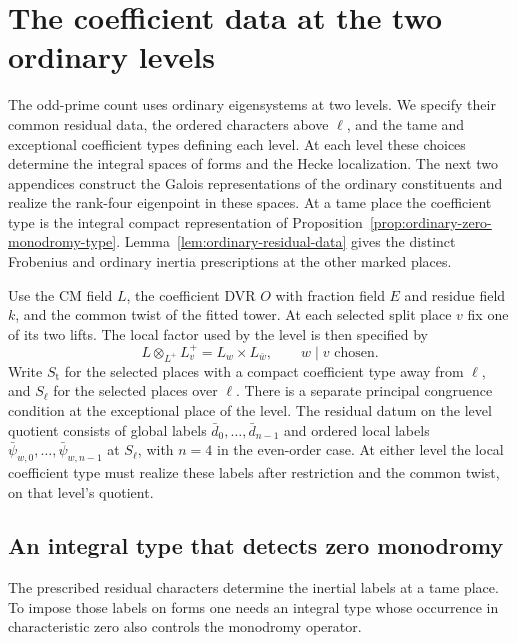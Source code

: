 \section{The coefficient data at the two ordinary levels}
\label{sec:count-two-level-data}
\hypertarget{source-ordinary-level-data}{}

The odd-prime count uses ordinary eigensystems at two levels. We specify their common residual data, the ordered characters above \(\ell\), and the tame and exceptional coefficient types defining each level. At each level these choices determine the
integral spaces of forms and the Hecke localization. The next two appendices construct the Galois representations of the ordinary constituents and realize the rank-four eigenpoint in these spaces. At a tame place the coefficient type is the integral compact representation of Proposition~\ref{prop:ordinary-zero-monodromy-type}. Lemma~\ref{lem:ordinary-residual-data} gives the distinct Frobenius and ordinary inertia prescriptions at the other marked places.

Use the CM field \(L\), the coefficient DVR \(O\) with fraction
field \(E\) and residue field \(k\), and the common twist of the
fitted tower. At each selected split place \(v\) fix one of its two lifts. The local factor used by the level is then specified by
\[
 L\otimes_{L^+}L^+_v=L_w\times L_{\bar w},\qquad w\mid v\text{ chosen}.
\] Write \(S_{\mathrm t}\)
for the selected places with a compact coefficient type away from
\(\ell\), and \(S_\ell\) for the selected places over \(\ell\).
There is a separate principal congruence condition at the
exceptional place of the level. The residual datum on the level
quotient consists of global labels \(\bar d_0,\ldots,\bar d_{n-1}\)
and ordered local labels \(\bar\psi_{w,0},\ldots,\bar\psi_{w,n-1}\)
at \(S_\ell\), with \(n=4\) in the even-order case. At either level the local coefficient type must realize these labels after restriction and the common twist, on that level's quotient.

\subsection{An integral type that detects zero monodromy}

The prescribed residual characters determine the inertial labels at a tame place. To impose those labels on forms one needs an integral type whose occurrence in characteristic zero also controls the monodromy operator.

